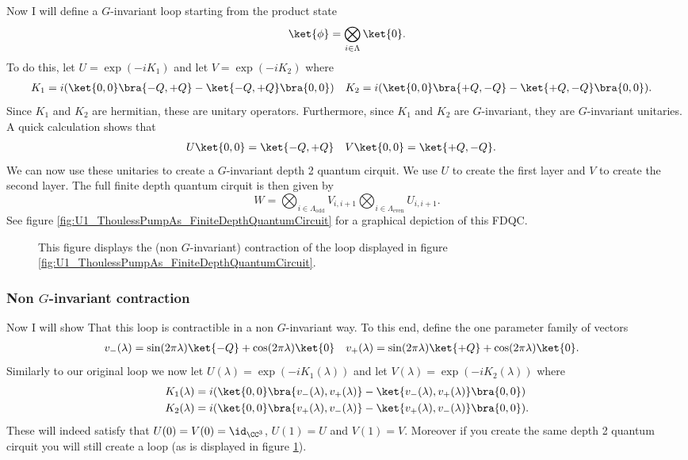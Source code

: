 Now I will define a $G$-invariant loop starting from the product state
\begin{equation}
	\ket{\phi}=\bigotimes_{i\in\Lambda}\ket{0}.
\end{equation}
To do this, let $U=\exp(-iK_1)$ and let $V=\exp(-i K_2)$ where
\begin{align}
	K_1&=i(\ket{0,0}\bra{-Q,+Q}-\ket{-Q,+Q}\bra{0,0})&K_2&=i(\ket{0,0}\bra{+Q,-Q}-\ket{+Q,-Q}\bra{0,0}).
\end{align}
Since $K_1$ and $K_2$ are hermitian, these are unitary operators. Furthermore, since $K_1$ and $K_2$ are $G$-invariant, they are $G$-invariant unitaries. A quick calculation shows that
\begin{align}
	U\ket{0,0}&=\ket{-Q,+Q}&V \ket{0,0}&=\ket{+Q,-Q}.
\end{align}
We can now use these unitaries to create a $G$-invariant depth 2 quantum cirquit. We use $U$ to create the first layer and $V$ to create the second layer. The full finite depth quantum cirquit is then given by
\begin{equation}
	W=\bigotimes_{i\in\Lambda_{\text{odd}}}V_{i,i+1}\bigotimes_{i\in\Lambda_{\text{even}}}U_{i,i+1}.
\end{equation}
See figure \ref{fig:U1_ThoulessPumpAs_FiniteDepthQuantumCircuit} for a graphical depiction of this FDQC.
\begin{figure}
	\centering
	\scalebox{0.78}{
		
	}
	\caption{This figure displays the (non $G$-invariant) contraction of the loop displayed in figure \ref{fig:U1_ThoulessPumpAs_FiniteDepthQuantumCircuit}.}
	\label{fig:U1_ThoulessPumpAs_FiniteDepthQuantumCircuit_Contraction}
\end{figure}
\subsubsection{Non $G$-invariant contraction}
Now I will show That this loop is contractible in a non $G$-invariant way. To this end, define the one parameter family of vectors
\begin{align}
	v_-(\lambda)&=\sin(2\pi\lambda)\ket{-Q}+\cos(2\pi\lambda)\ket{0}&v_+(\lambda)&=\sin(2\pi\lambda)\ket{+Q}+\cos(2\pi\lambda)\ket{0}.
\end{align}
Similarly to our original loop we now let $U(\lambda)=\exp(-iK_1(\lambda))$ and let $V(\lambda)=\exp(-i K_2(\lambda))$ where
\begin{align}
	K_1(\lambda)&=i(\ket{0,0}\bra{v_-(\lambda),v_+(\lambda)}-\ket{v_-(\lambda),v_+(\lambda)}\bra{0,0})\\
	K_2(\lambda)&=i(\ket{0,0}\bra{v_+(\lambda),v_-(\lambda)}-\ket{v_+(\lambda),v_-(\lambda)}\bra{0,0}).
\end{align}
These will indeed satisfy that $U(0)=V(0)=\id_{\CC^3}$, $U(1)=U$ and $V(1)=V$. Moreover if you create the same depth 2 quantum cirquit you will still create a loop (as is displayed in figure \ref{fig:U1_ThoulessPumpAs_FiniteDepthQuantumCircuit_Contraction}).
